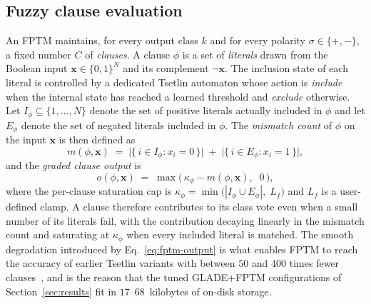 \documentclass[journal,10pt]{IEEEtran}
\begin{document}
\subsection{Fuzzy clause evaluation}
\label{sec:fptm-clause}
An FPTM maintains, for every output class $k$ and for every polarity
$\sigma \in \{+,-\}$, a fixed number $C$ of \emph{clauses}. A clause
$\phi$ is a set of \emph{literals} drawn from the Boolean input
$\mathbf{x} \in \{0,1\}^{N}$ and its complement $\neg\mathbf{x}$. The
inclusion state of each literal is controlled by a dedicated Tsetlin
automaton whose action is \emph{include} when the internal state has
reached a learned threshold and \emph{exclude} otherwise. Let
$I_\phi \subseteq \{1,\dots,N\}$ denote the set of positive literals
actually included in $\phi$ and let $E_\phi$ denote the set of
negated literals included in $\phi$. The \emph{mismatch count} of
$\phi$ on the input $\mathbf{x}$ is then defined as
\begin{equation}
  m(\phi, \mathbf{x}) \;=\;
    \bigl|\{\, i \in I_\phi : x_i = 0 \,\}\bigr|
    \;+\; \bigl|\{\, i \in E_\phi : x_i = 1 \,\}\bigr|,
  \label{eq:fptm-mismatch}
\end{equation}
and the \emph{graded clause output} is
\begin{equation}
  o(\phi, \mathbf{x}) \;=\;
    \max\bigl(\, \kappa_\phi - m(\phi,\mathbf{x}),\;\; 0 \,\bigr),
  \label{eq:fptm-output}
\end{equation}
where the per-clause saturation cap is
$\kappa_\phi = \min\bigl(|I_\phi \cup E_\phi|,\; L_f\bigr)$ and
$L_f$ is a user-defined clamp. A clause therefore contributes to its
class vote even when a small number of its literals fail, with the
contribution decaying linearly in the mismatch count and saturating
at $\kappa_\phi$ when every included literal is matched. The smooth
degradation introduced by Eq.~\eqref{eq:fptm-output} is what enables
FPTM to reach the accuracy of earlier Tsetlin variants with between
$50$ and $400$ times fewer clauses~\cite{hnilov2025fuzzy}, and is the
reason that the tuned GLADE+FPTM configurations of
Section~\ref{sec:results} fit in $17$--$68$~kilobytes of on-disk
storage.
\end{document}
